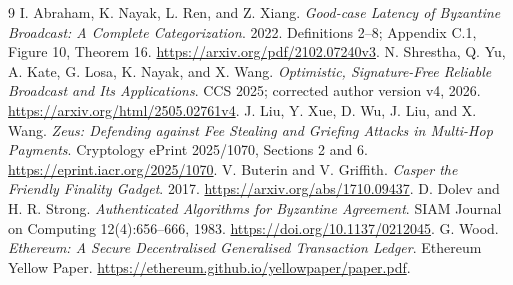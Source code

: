 \documentclass[11pt,a4paper,onecolumn]{article}
\theoremstyle{remark}\newtheorem{example}[definition]{Example}
\begin{document}
\begin{thebibliography}{9}\small
\setlength{\itemsep}{2pt}
 I. Abraham, K. Nayak, L. Ren, and Z. Xiang.
\emph{Good-case Latency of Byzantine Broadcast: A Complete Categorization}.
2022. Definitions 2--8; Appendix C.1, Figure 10, Theorem 16.
\url{https://arxiv.org/pdf/2102.07240v3}.
 N. Shrestha, Q. Yu, A. Kate, G. Losa, K. Nayak,
and X. Wang. \emph{Optimistic, Signature-Free Reliable Broadcast and Its
Applications}. CCS 2025; corrected author version v4, 2026.
\url{https://arxiv.org/html/2505.02761v4}.
 J. Liu, Y. Xue, D. Wu, J. Liu, and X. Wang.
\emph{Zeus: Defending against Fee Stealing and Griefing Attacks in Multi-Hop
Payments}. Cryptology ePrint 2025/1070, Sections 2 and 6.
\url{https://eprint.iacr.org/2025/1070}.
 V. Buterin and V. Griffith.
\emph{Casper the Friendly Finality Gadget}. 2017.
\url{https://arxiv.org/abs/1710.09437}.
 D. Dolev and H. R. Strong.
\emph{Authenticated Algorithms for Byzantine Agreement}.
SIAM Journal on Computing 12(4):656--666, 1983.
\url{https://doi.org/10.1137/0212045}.
 G. Wood.
\emph{Ethereum: A Secure Decentralised Generalised Transaction Ledger}.
Ethereum Yellow Paper. \url{https://ethereum.github.io/yellowpaper/paper.pdf}.
\end{thebibliography}
\end{document}
